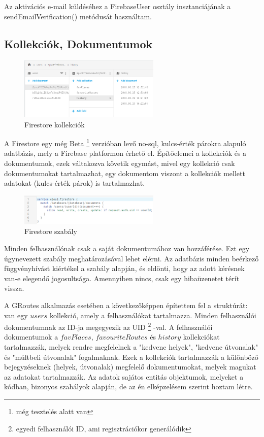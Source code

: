 Az aktivációs e-mail küldéséhez a FirebaseUser osztály insztanciájának a sendEmailVerification() metódusát használtam.

\subsection{Kollekciók, Dokumentumok}

\begin{figure}
	\centering
	\setlength{\abovecaptionskip}{0pt}
	\setlength{\belowcaptionskip}{0pt}
	\includegraphics[width=0.6\textwidth]{images/firestore_colls}
	\caption{Firestore kollekciók\label{fig:ALAP:sm2}}
\end{figure}

A Firestore egy még Beta%
\footnote{ %
	még tesztelés alatt van
}  %
 verzióban levő no-sql, kulcs-érték párokra alapuló adatbázis, mely a Firebase platformon érhető el. Építőelemei a kollekciók és a dokumentumok, ezek váltakozva követik egymást, mivel egy kollekció csak dokumentumokat tartalmazhat, egy dokumentom viszont a kollekciók mellett adatokat (kulcs-érték párok) is tartalmazhat. 
 
 \begin{figure}
 	\centering
 	\setlength{\abovecaptionskip}{0pt}
 	\setlength{\belowcaptionskip}{0pt}
 	\includegraphics[width=0.6\textwidth]{images/firestore_rule}
 	\caption{Firestore szabály\label{fig:ALAP:sm2}}
 \end{figure}
 
Minden felhasználónak csak a saját dokumentumához van hozzáférése. Ezt egy úgynevezett szabály meghatározásával lehet elérni. Az adatbázis minden beérkező függvényhívást kiértékel a szabály alapján, és eldönti, hogy az adott kérésnek van-e elegendő jogosultsága. Amennyiben nincs, csak egy hibaüzenetet térít vissza.

 A GRoutes alkalmazás esetében a következőképpen építettem fel a struktúrát: van egy \(users\) kollekció, amely a felhasználókat tartalmazza. Minden felhasználói dokumentumnak az ID-ja megegyezik az UID%
\footnote{ %
	egyedi felhasználói ID, ami regisztrációkor generálódik
}  %
-val. A felhasználói dokumentumok a \(favPlaces\), \(favouriteRoutes\) és \(history\) kollekciókat tartalmazzák, melyek rendre megfelelnek a "kedvenc helyek", "kedvenc útvonalak" és "múltbeli útvonalak" fogalmaknak. Ezek a kollekciók tartalmazzák a különböző bejegyzéseknek (helyek, útvonalak) megfelelő dokumentumokat, melyek magukat az adatokat tartalmazzák. Az adatok sajátos entitás objektumok, melyeket a kódban, bizonyos szabályok alapján, de az én elképzelésem szerint hoztam létre. 


